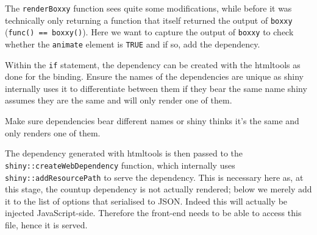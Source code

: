 \documentclass[
  10pt,
]{krantz}
\makeatletter
\newenvironment{Shaded}{\begin{snugshade}}{\end{snugshade}}
\newcommand{\CommentTok}[1]{\textcolor[rgb]{0.37,0.37,0.37}{\textit{#1}}}
\newcommand{\ControlFlowTok}[1]{\textcolor[rgb]{0.27,0.27,0.27}{\textbf{#1}}}
\newcommand{\DataTypeTok}[1]{\textcolor[rgb]{0.27,0.27,0.27}{#1}}
\newcommand{\KeywordTok}[1]{\textcolor[rgb]{0.27,0.27,0.27}{\textbf{#1}}}
\newcommand{\NormalTok}[1]{#1}
\newcommand{\OperatorTok}[1]{\textcolor[rgb]{0.43,0.43,0.43}{\textbf{#1}}}
\newcommand{\OtherTok}[1]{\textcolor[rgb]{0.37,0.37,0.37}{#1}}
\newcommand{\StringTok}[1]{\textcolor[rgb]{0.5,0.5,0.5}{#1}}
\newenvironment{kframe}{%
\medskip{}
\setlength{\fboxsep}{.8em}
 \def\at@end@of@kframe{}%
 \ifinner\ifhmode%
  \def\at@end@of@kframe{\end{minipage}}%
  \begin{minipage}{\columnwidth}%
 \fi\fi%
 \def\FrameCommand##1{\hskip\@totalleftmargin \hskip-\fboxsep
 \colorbox{shadecolor}{##1}\hskip-\fboxsep
     \hskip-\linewidth \hskip-\@totalleftmargin \hskip\columnwidth}%
 \MakeFramed {\advance\hsize-\width
   \@totalleftmargin\z@ \linewidth\hsize
   \@setminipage}}%
 {\par\unskip\endMakeFramed%
 \at@end@of@kframe}
\renewenvironment{Shaded}{\begin{kframe}}{\end{kframe}}
\newenvironment{rmdblock}[1]
  {
  \begin{itemize}
  \renewcommand{\labelitemi}{
    \raisebox{-.7\height}[0pt][0pt]{
      {\setkeys{Gin}{width=3em,keepaspectratio}\texttt{[image: images/\#1]}}
    }
  }
  \setlength{\fboxsep}{1em}
  \begin{kframe}
  \item
  }
  {
  \end{kframe}
  \end{itemize}
  }
\newenvironment{rmdnote}
  {\begin{rmdblock}{note}}
  {\end{rmdblock}}
\makeatother
\begin{document}
The \texttt{renderBoxxy} function sees quite some modifications, while before it was technically only returning a function that itself returned the output of \texttt{boxxy} (\texttt{func()\ ==\ boxxy()}). Here we want to capture the output of \texttt{boxxy} to check whether the \texttt{animate} element is \texttt{TRUE} and if so, add the dependency.

\begin{Shaded}
\end{Shaded}

Within the \texttt{if} statement, the dependency can be created with the htmltools as done for the binding. Ensure the names of the dependencies are unique as shiny internally uses it to differentiate between them if they bear the same name shiny assumes they are the same and will only render one of them.

\begin{rmdnote}
Make sure dependencies bear different names or shiny thinks it's the
same and only renders one of them.
\end{rmdnote}

The dependency generated with htmltools is then passed to the \texttt{shiny::createWebDependency} function, which internally uses \texttt{shiny::addResourcePath} to serve the dependency. This is necessary here as, at this stage, the countup dependency is not actually rendered; below we merely add it to the list of options that serialised to JSON. Indeed this will actually be injected JavaScript-side. Therefore the front-end needs to be able to access this file, hence it is served.
\end{document}
